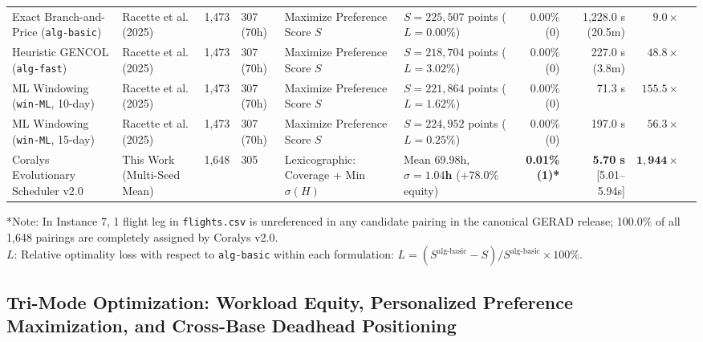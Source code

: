\documentclass[journal]{IEEEtran}
\begin{document}
\begin{table}[t]
{\begin{tabular}{llrlllrrrr}
Exact Branch-and-Price (\texttt{alg-basic}) & Racette et al. (2025) \cite{racette2025} & 1,473 & 307 (70h) & Maximize Preference Score $S$ & $S = 225,507$ points ($L = 0.00\%$) & 0.00\% (0) & 1,228.0 s (20.5m) & $9.0\times$ \\
Heuristic GENCOL (\texttt{alg-fast}) & Racette et al. (2025) \cite{racette2025} & 1,473 & 307 (70h) & Maximize Preference Score $S$ & $S = 218,704$ points ($L = 3.02\%$) & 0.00\% (0) & 227.0 s (3.8m) & $48.8\times$ \\
ML Windowing (\texttt{win-ML}, 10-day) & Racette et al. (2025) \cite{racette2025} & 1,473 & 307 (70h) & Maximize Preference Score $S$ & $S = 221,864$ points ($L = 1.62\%$) & 0.00\% (0) & 71.3 s & $155.5\times$ \\
ML Windowing (\texttt{win-ML}, 15-day) & Racette et al. (2025) \cite{racette2025} & 1,473 & 307 (70h) & Maximize Preference Score $S$ & $S = 224,952$ points ($L = \mathbf{0.25\%}$) & 0.00\% (0) & 197.0 s & $56.3\times$ \\
Coralys Evolutionary Scheduler v2.0 & This Work (Multi-Seed Mean) & 1,648 & 305 & Lexicographic: Coverage + Min $\sigma(H)$ & Mean 69.98h, $\sigma = \mathbf{1.04h}$ (+78.0\% equity) & \textbf{0.01\% (1)*} & \textbf{5.70 s} [5.01--5.94s] & $\mathbf{1,944\times}$ \\
\bottomrule
\end{tabular}%
}
\begin{flushleft}
\footnotesize
*Note: In Instance 7, 1 flight leg in \texttt{flights.csv} is unreferenced in any candidate pairing in the canonical GERAD release; 100.0\% of all 1,648 pairings are completely assigned by Coralys v2.0.\\
$L$: Relative optimality loss with respect to \texttt{alg-basic} within each formulation: $L = (S^{\text{alg-basic}} - S) / S^{\text{alg-basic}} \times 100\%$.
\end{flushleft}
\end{table}

\subsection{Tri-Mode Optimization: Workload Equity, Personalized Preference Maximization, and Cross-Base Deadhead Positioning}
\end{document}
